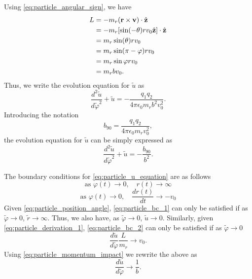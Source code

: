 \documentclass[oneside,a4paper,11pt]{report}
\begin{document}
Using \cref{eq:particle_angular_sign}, we have
\begin{align}
    \label{eq:particle_momentum_impact}
    L &= -m_r ( \mathbf{r} \times \mathbf{v} )\cdot \hat{\mathbf{z}} \nonumber \\
    &= -m_r [\sin(-\theta) r v_0 \hat{\mathbf{z}} ] \cdot \hat{\mathbf{z}} \nonumber \\
    &= m_r\sin(\theta) r v_0 \nonumber \\
    &= m_r\sin(\pi - \varphi) r v_0 \nonumber \\
    &= m_r\sin\varphi r v_0 \nonumber \\
    &= m_r b v_0.
\end{align}
Thus, we write the evolution equation for $\tilde{u}$ as
\begin{equation}
    \frac{d^2 \tilde{u}}{d \tilde{\varphi}^2} + \tilde{u} = -\frac{q_1 q_2}{4 \pi \epsilon_0 m_r b^2 v_0^2}.
\end{equation}
Introducing the notation
\begin{equation}
    b_{90} = \frac{q_1 q_2}{4 \pi \epsilon_0 m_r v_0^2},
\end{equation}
the evolution equation for $\tilde{u}$ can be simply expressed as
\begin{equation}
    \label{eq:particle_u_equation}
    \frac{d^2 \tilde{u}}{d \tilde{\varphi}^2} + \tilde{u} = -\frac{b_{90}}{b^2}.
\end{equation}

The boundary conditions for \cref{eq:particle_u_equation} are as follows
\begin{equation}
    \label{eq:particle_bc_1}
    \text{as } \varphi(t) \to 0, \quad r(t) \to \infty
\end{equation}
\begin{equation}
    \label{eq:particle_bc_2}
    \text{as } \varphi(t) \to 0, \quad \frac{dr(t)}{dt} \to -v_0
\end{equation}
Given \cref{eq:particle_position_angle}, \cref{eq:particle_bc_1} can only be satisfied if as $\tilde{\varphi} \to 0$, $\tilde{r} \to \infty$. Thus, we also have, as $\tilde{\varphi} \to 0$, $\tilde{u} \to 0$. Similarly, given \cref{eq:particle_derivation_1}, \cref{eq:particle_bc_2} can only be satisfied if as $\tilde{\varphi} \to 0$
\begin{equation}
    \frac{d\tilde{u}}{d\tilde{\varphi}} \frac{L}{m_r} \to v_0.
\end{equation}
Using \cref{eq:particle_momentum_impact} we rewrite the above as 
\begin{equation}
    \frac{d\tilde{u}}{d\tilde{\varphi}} \to \frac{1}{b}.
\end{equation}
\end{document}
